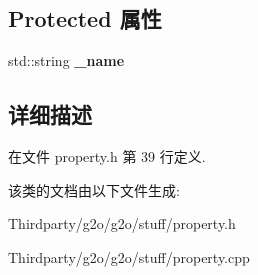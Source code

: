 \subsection*{Protected 属性}
\begin{DoxyCompactItemize}
\item 
\hypertarget{classg2o_1_1BaseProperty_a74e4bbf35ddf26022cb39be2ea7abd2b}{std\-::string {\bfseries \-\_\-name}}\label{classg2o_1_1BaseProperty_a74e4bbf35ddf26022cb39be2ea7abd2b}

\end{DoxyCompactItemize}


\subsection{详细描述}


在文件 property.\-h 第 39 行定义.



该类的文档由以下文件生成\-:\begin{DoxyCompactItemize}
\item 
Thirdparty/g2o/g2o/stuff/property.\-h\item 
Thirdparty/g2o/g2o/stuff/property.\-cpp\end{DoxyCompactItemize}
